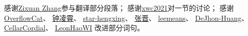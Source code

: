 感谢\href{https://zixuan-zhang.com}{Zixuan Zhang}参与翻译部分段落；
感谢\href{https://github.com/xwc2021}{xwc2021}对一节的讨论；
感谢\href{https://github.com/OverflowCat}{OverflowCat}、
\href{https://www.zhihu.com/people/zhong-ling-xiao}{钟凌霄}、
\href{https://github.com/star-hengxing}{star-hengxing}、
\href{https://theigrams.github.io/}{张晋}、
\href{https://github.com/leemeans}{leemeans}、
\href{https://www.zhihu.com/people/itact/posts}{DeJhon-Huang}、
\href{https://github.com/CellarCordial}{CellarCordial}、
\href{https://github.com/LeonHaoWI}{LeonHaoWI}
改进部分词句。